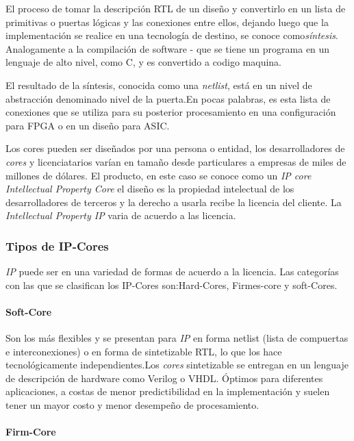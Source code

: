 El proceso de tomar la descripción RTL de un diseño y convertirlo en un lista de primitivas o puertas lógicas y las conexiones entre ellos, dejando luego que la  implementación se realice en una tecnología de destino, se conoce como\textit{síntesis}. Analogamente a la compilación de software - que se tiene un programa en un lenguaje de alto nivel, como C, y  es convertido a codigo maquina. 

El resultado de la síntesis, conocida como una \textit{netlist}, está en un nivel de abstracción denominado nivel de la puerta.En pocas palabras, es esta lista de conexiones que se utiliza para su posterior procesamiento en una configuración para FPGA o en un diseño para ASIC.

Los cores pueden ser diseñados por una persona o entidad, los desarrolladores de \textit{cores} y licenciatarios varían en tamaño desde particulares a empresas de miles de millones de dólares. El producto, en este caso se conoce como un \textit{IP core  Intellectual Property Core} el diseño es la propiedad intelectual de los desarrolladores de terceros y la derecho a usarla recibe la licencia del cliente. La \textit{Intellectual Property IP} varia  de  acuerdo a las licencia.

		\subsubsection{Tipos de IP-Cores}

\textit{IP} puede ser en una variedad de formas de acuerdo a la licencia. Las categorías con las que se clasifican los IP-Cores son:Hard-Cores, Firmes-core y soft-Cores.
		
			\paragraph{Soft-Core}

Son los más flexibles y se presentan para \textit{IP} en forma netlist (lista de compuertas e interconexiones) o en forma de sintetizable RTL, lo que los hace tecnológicamente independientes.Los \textit{cores} sintetizable se entregan en un lenguaje de descripción de hardware como Verilog o VHDL. 
 Óptimos para diferentes aplicaciones, a costas de menor predictibilidad en la implementación y suelen tener un mayor costo y menor desempeño de procesamiento.

			\paragraph{Firm-Core}

